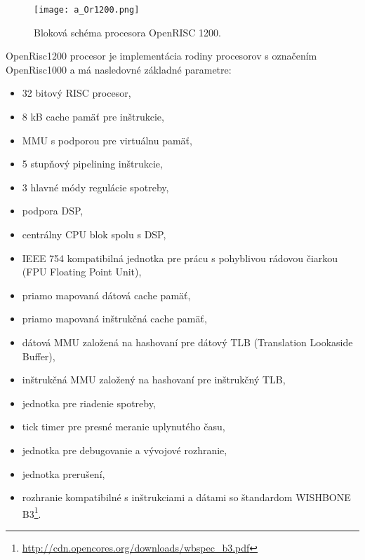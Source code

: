 \documentclass[12pt,a4paper,oneside,openright]{report}
\begin{document}


\begin{figure*}[h]
	\centering
	\texttt{[image: a\_Or1200.png]}
	\caption{Bloková schéma procesora OpenRISC 1200.\cite{openrisc}}
	\label{f:o_orisc2}
\end{figure*}
OpenRisc1200 procesor je implementácia rodiny procesorov s označením OpenRisc1000 a má nasledovné základné parametre:
\singlespacing
\begin{itemize}
\item 32 bitový RISC procesor,
\item 8 kB cache pamäť pre inštrukcie,
\item MMU s podporou pre virtuálnu pamäť,
\item 5 stupňový pipelining inštrukcie,
\item 3 hlavné módy regulácie spotreby,
\item podpora DSP,
\item centrálny CPU blok spolu s DSP,
\item IEEE 754 kompatibilná jednotka pre prácu s pohyblivou rádovou čiarkou (FPU Floating Point Unit),
\item priamo mapovaná dátová cache pamäť,
\item priamo mapovaná inštrukčná cache pamäť,
\item dátová MMU založená na hashovaní pre dátový TLB (Translation Lookaside Buffer),
\item inštrukčná MMU založený na hashovaní pre inštrukčný TLB,
\item jednotka pre riadenie spotreby,
\item tick timer pre presné meranie uplynutého času,
\item jednotka pre debugovanie a vývojové rozhranie,
\item jednotka prerušení,
\item rozhranie kompatibilné s inštrukciami a dátami so štandardom WISHBONE B3\footnote{\url{http://cdn.opencores.org/downloads/wbspec_b3.pdf}}.
\end{itemize}
\onehalfspacing
\end{document}
